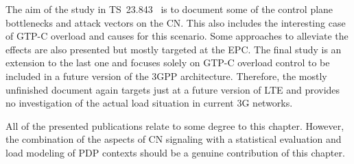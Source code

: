 The aim of the study in \gls{TS}~23.843~\cite{3gpp.23.843} is to document some of the control plane bottlenecks and attack vectors on the \gls{CN}. This also includes the interesting case of \gls{GTP-C} overload and causes for this scenario. Some approaches to alleviate the effects are also presented but mostly targeted at the \gls{EPC}. The final study is an extension to the last one \cite{3gpp.29.807} and focuses solely on \gls{GTP-C} overload control to be included in a future version of the \gls{3GPP} architecture. Therefore, the mostly unfinished document again targets just at a future version of \gls{LTE} and provides no investigation of the actual load situation in current \gls{3G} networks.

All of the presented publications relate to some degree to this chapter. However, the combination of the aspects of \gls{CN} signaling with a statistical evaluation and load modeling of \gls{PDP} contexts should be a genuine contribution of this chapter.



